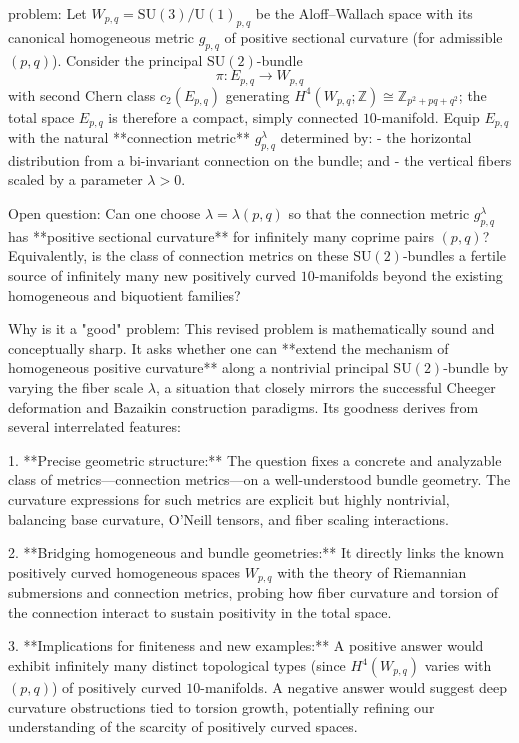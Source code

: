 problem:  
Let \( W_{p,q} = \mathrm{SU}(3)/\mathrm{U}(1)_{p,q} \) be the Aloff–Wallach space with its canonical homogeneous metric \( g_{p,q} \) of positive sectional curvature (for admissible \((p,q)\)).  
Consider the principal \(\mathrm{SU}(2)\)-bundle  
\[
\pi : E_{p,q} \to W_{p,q}
\]
with second Chern class \(c_2(E_{p,q})\) generating \(H^4(W_{p,q};\mathbb{Z}) \cong \mathbb{Z}_{p^2+pq+q^2}\); the total space \(E_{p,q}\) is therefore a compact, simply connected \(10\)-manifold.  
Equip \(E_{p,q}\) with the natural **connection metric** \(g^{\lambda}_{p,q}\) determined by:  
- the horizontal distribution from a bi-invariant connection on the bundle; and  
- the vertical fibers scaled by a parameter \(\lambda > 0\).  

Open question:  
Can one choose \(\lambda=\lambda(p,q)\) so that the connection metric \(g^{\lambda}_{p,q}\) has **positive sectional curvature** for infinitely many coprime pairs \((p,q)\)?  
Equivalently, is the class of connection metrics on these \(\mathrm{SU}(2)\)-bundles a fertile source of infinitely many new positively curved \(10\)-manifolds beyond the existing homogeneous and biquotient families?

Why is it a "good" problem:  
This revised problem is mathematically sound and conceptually sharp. It asks whether one can **extend the mechanism of homogeneous positive curvature** along a nontrivial principal \(\mathrm{SU}(2)\)-bundle by varying the fiber scale \(\lambda\), a situation that closely mirrors the successful Cheeger deformation and Bazaikin construction paradigms. Its goodness derives from several interrelated features:

1. **Precise geometric structure:**  
   The question fixes a concrete and analyzable class of metrics—connection metrics—on a well-understood bundle geometry. The curvature expressions for such metrics are explicit but highly nontrivial, balancing base curvature, O’Neill tensors, and fiber scaling interactions.

2. **Bridging homogeneous and bundle geometries:**  
   It directly links the known positively curved homogeneous spaces \(W_{p,q}\) with the theory of Riemannian submersions and connection metrics, probing how fiber curvature and torsion of the connection interact to sustain positivity in the total space.  

3. **Implications for finiteness and new examples:**  
   A positive answer would exhibit infinitely many distinct topological types (since \(H^4(W_{p,q})\) varies with \((p,q)\)) of positively curved \(10\)-manifolds. A negative answer would suggest deep curvature obstructions tied to torsion growth, potentially refining our understanding of the scarcity of positively curved spaces.


